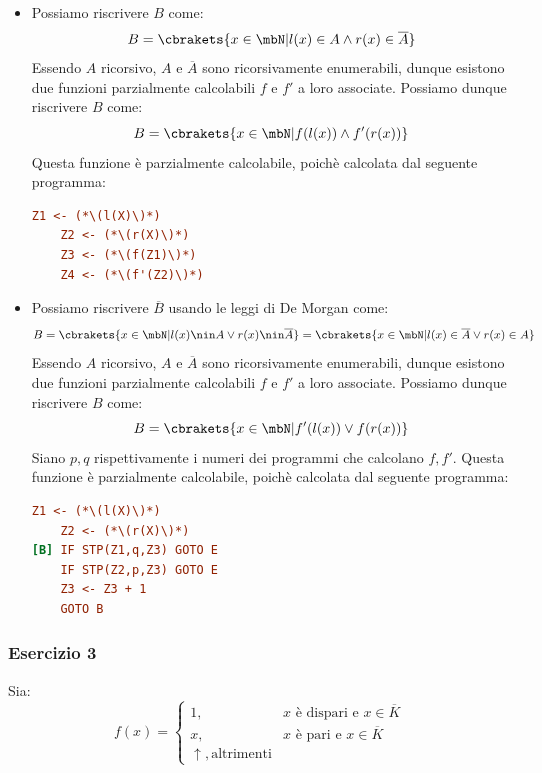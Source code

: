 \begin{itemize}
  \item[\(B\):] Possiamo riscrivere \(B\) come:
  \begin{equation}
    B=\cbrakets{x \in \mbN \vert l(x) \in A \land r(x) \in \overline{A}}
  \end{equation}
  Essendo \(A\) ricorsivo, \(A\) e \(\overline{A}\) sono ricorsivamente enumerabili, dunque esistono due funzioni parzialmente calcolabili \(f\) e \(f'\) a loro associate. Possiamo dunque riscrivere \(B\) come:
  \begin{equation}
    B=\cbrakets{x \in \mbN \vert f(l(x)) \land f'(r(x))}
  \end{equation}
  Questa funzione è parzialmente calcolabile, poichè calcolata dal seguente programma:
  \begin{lstlisting}[language=ini, caption={ }]
    Z1 <- (*\(l(X)\)*)
    Z2 <- (*\(r(X)\)*)
    Z3 <- (*\(f(Z1)\)*)
    Z4 <- (*\(f'(Z2)\)*)
  \end{lstlisting}
  \item[\(\overline{B}\):] Possiamo riscrivere \(\overline{B}\) usando le leggi di De Morgan come:
  \begin{equation}
    B=\cbrakets{x \in \mbN \vert l(x) \nin A \lor r(x) \nin \overline{A}}=\cbrakets{x \in \mbN \vert l(x) \in \overline{A} \lor r(x) \in A}
  \end{equation}
  Essendo \(A\) ricorsivo, \(A\) e \(\overline{A}\) sono ricorsivamente enumerabili, dunque esistono due funzioni parzialmente calcolabili \(f\) e \(f'\) a loro associate. Possiamo dunque riscrivere \(B\) come:
  \begin{equation}
    B=\cbrakets{x \in \mbN \vert f'(l(x)) \lor f(r(x))}
  \end{equation}
  Siano \(p,q\) rispettivamente i numeri dei programmi che calcolano \(f,f'\). Questa funzione è parzialmente calcolabile, poichè calcolata dal seguente programma:
  \begin{lstlisting}[language=ini, caption={ }]
    Z1 <- (*\(l(X)\)*)
    Z2 <- (*\(r(X)\)*)
[B] IF STP(Z1,q,Z3) GOTO E
    IF STP(Z2,p,Z3) GOTO E
    Z3 <- Z3 + 1
    GOTO B
  \end{lstlisting}
\end{itemize}

\subsubsection{Esercizio 3}

Sia:
\begin{equation}
  f(x) = \begin{cases}
    1, & x \text{ è dispari e } x \in \overline{K}\\
    x, & x \text{ è pari e } x \in \overline{K}\\
    \uparrow, \text{altrimenti}
  \end{cases}
\end{equation}

